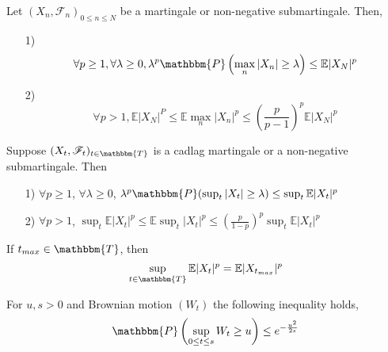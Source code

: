 \documentclass[12pt,a4paper]{article}
\newcommand{\E}{\mathbb{E}}
\begin{document}
\begin{corollary}{}{}
    Let $(X_n,\mathscr{F}_n)_{0\le n\le N}$ be a martingale or non-negative submartingale. Then,
    \begin{enumerate}
        \item[1)]
        $$
        \forall p\ge 1, \forall\lambda\ge 0, \lambda^p \mathbbm{P}\left(\max_n |X_n|\ge \lambda\right)\le \E|X_N|^p
        $$
        \item[2)]
        $$
        \forall p>1, \E|X_N|^P \le \E \max_n |X_n|^p \le \left(\frac{p}{p-1}\right)^p\E|X_N|^p
        $$
    \end{enumerate}
\end{corollary}
\begin{theorem}{}{}
    Suppose $(X_t,\mathscr{F}_t)_{t\in\mathbbm{T}}$ is a cadlag martingale or a non-negative submartingale. Then
    \begin{enumerate}
        \item[1)] $\forall p\ge 1$, $\forall \lambda\ge 0$, $\lambda^p \mathbbm{P}(\sup_t |X_t|\ge \lambda)\le \sup_t \E |X_t|^p$
        \item[2)] $\forall p>1$, $\sup_t\E|X_t|^p \le \E\sup_t |X_t|^p\le \left(\frac{p}{1-p}\right)^p \sup_t \E|X_t|^p$
    \end{enumerate}
\end{theorem}
\begin{remark}{}{}
    If $t_{max}\in \mathbbm{T}$, then
    $$
    \sup_{t\in\mathbbm{T}}\E|X_t|^p  = \E|X_{t_{max}}|^p
    $$
\end{remark}
\begin{corollary}{}{}
    For $u,s>0$ and Brownian motion $(W_t)$ the following inequality holds,
    $$
    \mathbbm{P}\left(\sup_{0\le t\le s} W_t\ge u\right)\le e^{-\frac{u^2}{2s}}
    $$
\end{corollary}
\pagebreak
\end{document}
